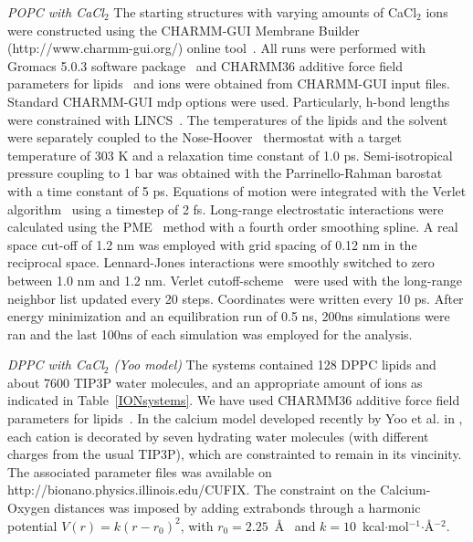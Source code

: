 \documentclass[pre,aps,floatfix,authordate1-4,twocolumn]{revtex4-1}
\begin{document}
{\it POPC with CaCl$_2$}
The starting structures with varying amounts of CaCl$_2$ ions were constructed using the CHARMM-GUI Membrane Builder (http://www.charmm-gui.org/) online tool~\cite{lee15}. 
All runs were performed with Gromacs 5.0.3 software package~\cite{abraham15} and CHARMM36 additive force field parameters for lipids~\cite{klauda10} and ions were obtained from CHARMM-GUI input files. 
Standard CHARMM-GUI mdp options were used. Particularly, h-bond lengths were constrained with LINCS~\cite{hess97,hess07}. The temperatures of the 
lipids and the solvent were separately coupled to the Nose-Hoover~\cite{nose84,hoover85} thermostat with a target temperature of 303 K and a relaxation time constant of 1.0 ps. Semi-isotropical 
pressure coupling to 1 bar was obtained with the Parrinello-Rahman barostat~\cite{parrinello81} with a time constant of 5 ps. Equations of motion were integrated with the Verlet algorithm~\cite{pall13} 
using a timestep of 2 fs. Long-range electrostatic interactions were calculated using the PME~\cite{darden93,essman95} method with a fourth order smoothing spline. A real space cut-off of 1.2 nm 
was employed with grid spacing of 0.12 nm in the reciprocal space. Lennard-Jones interactions were smoothly switched to zero between 1.0 nm and 1.2 nm. Verlet cutoff-scheme~\cite{pall13}  
were used with the long-range neighbor list updated every 20 steps. Coordinates were written every 10 ps.
After energy minimization and an equilibration run of 0.5 ns, 200ns simulations were ran and the last 100ns of each simulation was employed for the analysis.

{\it DPPC with CaCl$_2$ (Yoo model)}
The systems contained 128 DPPC lipids and about 7600 TIP3P water molecules,
and an appropriate amount of ions as indicated in  Table~\ref{IONsystems}.  
We have used CHARMM36 additive force field parameters for lipids~\cite{klauda10}. 
In the calcium model developed recently by Yoo et al. in \cite{yoo16}, 
each cation is decorated by seven hydrating water molecules (with different charges from the usual TIP3P),
which are constrainted to remain in its vincinity. The associated parameter files was available
on http://bionano.physics.illinois.edu/CUFIX. The constraint on the Calcium-Oxygen distances
was imposed by adding extrabonds through a harmonic potential $V(r) = k(r-r_0)^2$, 
with $r_0=2.25$~\AA~ and $k=10$~kcal$\cdot$mol$^{-1}$$\cdot$\AA$^{-2}$.
 
\end{document}
